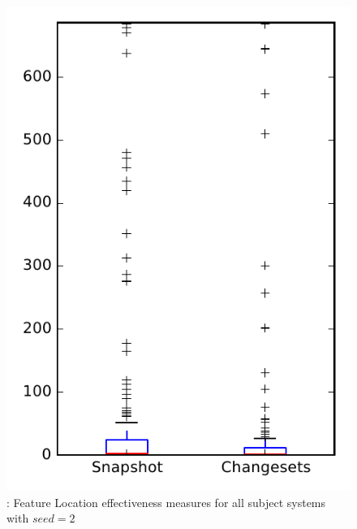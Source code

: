 
\begin{figure}
\centering
\includegraphics[height=0.4\textheight]{figures/flt_seed/rq1_overview_2}
\caption{\rone: Feature Location effectiveness measures for all subject systems with $seed=2$}
\label{fig:flt_seed:rq1:overview}
\end{figure}
